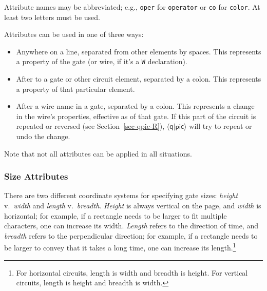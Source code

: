 \documentclass[twoside,12pt]{article}
\newcommand{\qpic}{$\langle\mathsf{q}|\mathsf{pic}\rangle$\xspace}
\begin{document}
Attribute names may be abbreviated; e.g., {\tt oper} for {\tt operator} or
{\tt co} for {\tt color}.  At least two letters must be used.

Attributes can be used in one of three ways:
\begin{itemize}
\item Anywhere on a line, separated from other elements by spaces.  This represents a property of the gate (or wire, if it's a {\tt W} declaration).
\item After to a gate or other circuit element, separated by a colon.  This represents a property of that particular element.
\item After a wire name in a gate, separated by a colon.  This represents a
  change in the wire's properties, effective as of that gate.  If this
  part of the circuit is repeated or reversed (see
  Section~\ref{sec-qpic-R}), \qpic will try to repeat or undo the change.
\end{itemize}
Note that not all attributes can be applied in all situations.

\subsubsection{Size Attributes}

There are two different coordinate systems for specifying gate sizes:  \emph{height} v.\ \emph{width} and
\emph{length} v.\ \emph{breadth}.  \emph{Height} is always vertical on the page, and \emph{width} is horizontal; for example,
if a rectangle needs to be larger to fit multiple characters, one can increase its width.  \emph{Length} refers to the direction
of time, and \emph{breadth} refers to the perpendicular direction; for example, if a rectangle needs to be larger to convey
that it takes a long time, one can increase its length.\footnote{For horizontal circuits, length is width and breadth is height.  For vertical circuits, length is height and breadth is width.}
\end{document}

